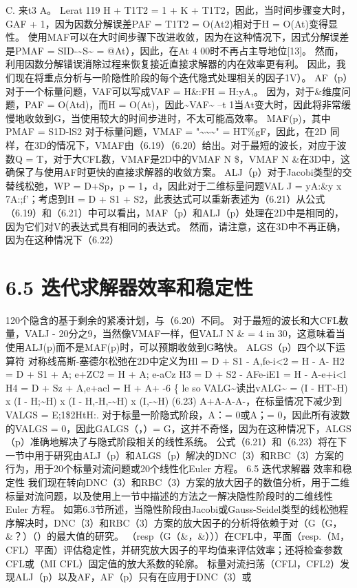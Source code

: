 \documentclass[UTF8,11pt,a4paper,openany,fontset=fandol]{ctexbook}
\begin{document}
C. 来t3 A。 Lerat 119 H + T1T2 = 1 + K + T1T2，因此，当时间步骤变大时，GAF + 1，因为因数分解误差PAF = T1T2 = O(At2)相对于H = O(At)变得显性。 使用MAF可以在大时间步骤下改进收敛，因为在这种情况下，因式分解误差是PMAF = SID-\textasciitilde{}S\textasciitilde{} = @At），因此，在At 4 00时不再占主导地位[13]。 然而，利用因数分解错误消除过程来恢复接近直接求解器的内在效率更有利。 因此，我们现在将重点分析与一阶隐性阶段的每个迭代隐式处理相关的因子1V）。 AF（p）对于一个标量问题，VAF可以写成VAF = H\&:FH = H:yA,。 因为，对于\&维度问题，PAF = O(Atd)，而H = O(At)，因此\textasciitilde{}VAF\textasciitilde{} --t 1当At变大时，因此将非常缓慢地收敛到G，当使用较大的时间步进时，不太可能高效率。 MAF(p)，其中PMAF = S1D-lS2 对于标量问题，VMAF = "\textasciitilde{}\textasciitilde{}\textasciitilde{}" = HT\%gF，因此，在2D 同样，在3D的情况下，VMAF由（6.19）（6.20）给出。对于最短的波长，对应于波数Q = T，对于大CFL数，VMAF是2D中的VMAF N \$，VMAF N \&在3D中，这确保了与使用AF时更快的直接求解器的收敛方案。 ALJ（p）对于Jacobi类型的交替线松弛，WP = D+Sp，p = 1，d，因此对于二维标量问题VAL J = yA:\&y x 7A:;f'；考虑到H = D + S1 + S2，此表达式可以重新表述为（6.21）从公式（6.19）和（6.21）中可以看出，MAF（p）和ALJ（p）处理在2D中是相同的，因为它们对V的表达式具有相同的表达式。 然而，请注意，这在3D中不再正确，因为在这种情况下（6.22）

\section{6.5 迭代求解器效率和稳定性}
120个隐含的基于剩余的紧凑计划，与（6.20）不同。 对于最短的波长和大CFL数量，VALJ - 20分之9，当然像VMAF一样，但VALJ N \& = 4 in 30，这意味着当使用ALJ(p)而不是MAF(p)时，可以预期收敛到G略快。 ALGS（p）四个以下运算符 对称线高斯-塞德尔松弛在2D中定义为Hl = D + S1 - A,fe-i<2 = H - A- H2 = D + S1 + A; e+ZC2 = H + A; e-aCz H3 = D + S2 - AFe-iE1 = H - A-e+i<l H4 = D + Sz + A,e+acl = H + A+ -6 \{ le so VALG\textasciitilde{}读出vALG\textasciitilde{} = (I - HT\textasciitilde{}H) x (I - H;\textasciitilde{}H) x (I - H,-H,-\textasciitilde{}H) x (I,-\textasciitilde{}H) (6.23) A+A-A-A-，在标量情况下减少到VALGS = E;1\$2HtH:. 对于标量一阶隐式阶段，A：= 0或A；= 0，因此所有波数的VALGS = 0，因此GALGS（，）= G，这并不奇怪，因为在这种情况下，ALGS（p）准确地解决了与隐式阶段相关的线性系统。 公式（6.21）和（6.23）将在下一节中用于研究由ALJ（p）和ALGS（p）解决的DNC（3）和RBC（3）方案的行为，用于20个标量对流问题或20个线性化Euler 方程。 6.5 迭代求解器 效率和稳定性 我们现在转向DNC（3）和RBC（3）方案的放大因子的数值分析，用于二维标量对流问题，以及使用上一节中描述的方法之一解决隐性阶段时的二维线性Euler 方程。 如第6.3节所述，当隐性阶段由Jacobi或Gauss-Seidel类型的线松弛程序解决时，DNC（3）和RBC（3）方案的放大因子的分析将依赖于对（G（G，\&？）（）的最大值的研究。 （resp（G（\&，\&）））在CFL中，平面（resp.（M，CFL）平面）评估稳定性，并研究放大因子的平均值来评估效率；还将检查参数CFL或（MI CFL）固定值的放大系数的轮廓。 标量对流扫荡（CFLl，CFL2）发现ALJ（p）以及AF，AF（p）只有在应用于DNC（3）或
\end{document}
